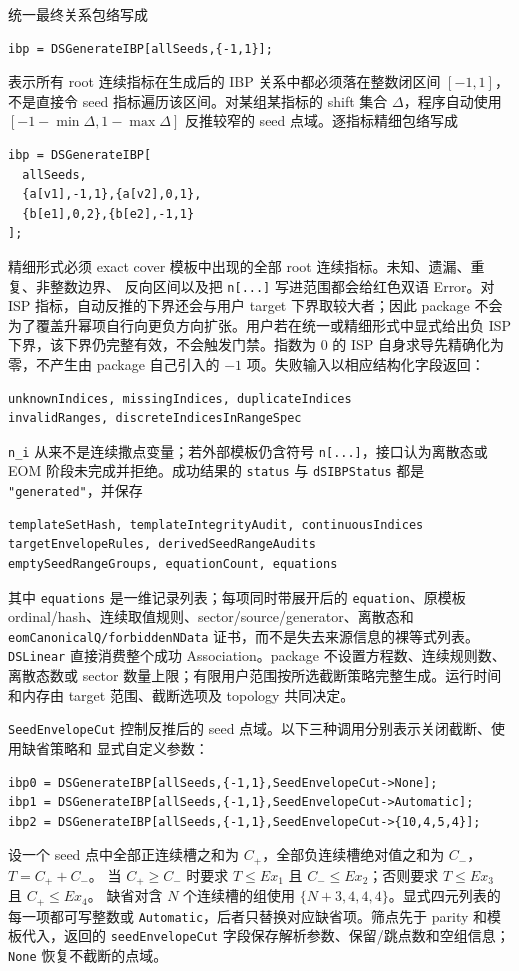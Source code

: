 ﻿\documentclass[a4paper,11pt]{article}
\begin{document}
统一最终关系包络写成
\begin{verbatim}
ibp = DSGenerateIBP[allSeeds,{-1,1}];
\end{verbatim}
表示所有 root 连续指标在生成后的 IBP 关系中都必须落在整数闭区间 $[-1,1]$，不是直接令
seed 指标遍历该区间。对某组某指标的 shift 集合 $\Delta$，程序自动使用
$[-1-\min\Delta,1-\max\Delta]$ 反推较窄的 seed 点域。逐指标精细包络写成
\begin{verbatim}
ibp = DSGenerateIBP[
  allSeeds,
  {a[v1],-1,1},{a[v2],0,1},
  {b[e1],0,2},{b[e2],-1,1}
];
\end{verbatim}
精细形式必须 exact cover 模板中出现的全部 root 连续指标。未知、遗漏、重复、非整数边界、
反向区间以及把 \texttt{n[...]} 写进范围都会给红色双语 Error。对 ISP 指标，自动反推的下界还会与用户 target 下界取较大者；因此 package 不会为了覆盖升幂项自行向更负方向扩张。用户若在统一或精细形式中显式给出负 ISP 下界，该下界仍完整有效，不会触发门禁。指数为 $0$ 的 ISP 自身求导先精确化为零，不产生由 package 自己引入的 $-1$ 项。失败输入以相应结构化字段返回：
\begin{verbatim}
unknownIndices, missingIndices, duplicateIndices
invalidRanges, discreteIndicesInRangeSpec
\end{verbatim}

\texttt{n\_i} 从来不是连续撒点变量；若外部模板仍含符号 \texttt{n[...]}，接口认为离散态或
EOM 阶段未完成并拒绝。成功结果的 \texttt{status} 与 \texttt{dSIBPStatus} 都是
\texttt{"generated"}，并保存
\begin{verbatim}
templateSetHash, templateIntegrityAudit, continuousIndices
targetEnvelopeRules, derivedSeedRangeAudits
emptySeedRangeGroups, equationCount, equations
\end{verbatim}
其中 \texttt{equations} 是一维记录列表；每项同时带展开后的 \texttt{equation}、原模板
ordinal/hash、连续取值规则、sector/source/generator、离散态和
\texttt{eomCanonicalQ/forbiddenNData} 证书，而不是失去来源信息的裸等式列表。
\texttt{DSLinear} 直接消费整个成功 Association。package 不设置方程数、连续规则数、离散态数或
sector 数量上限；有限用户范围按所选截断策略完整生成。运行时间和内存由 target 范围、截断选项及
topology 共同决定。

\texttt{SeedEnvelopeCut} 控制反推后的 seed 点域。以下三种调用分别表示关闭截断、使用缺省策略和
显式自定义参数：
\begin{verbatim}
ibp0 = DSGenerateIBP[allSeeds,{-1,1},SeedEnvelopeCut->None];
ibp1 = DSGenerateIBP[allSeeds,{-1,1},SeedEnvelopeCut->Automatic];
ibp2 = DSGenerateIBP[allSeeds,{-1,1},SeedEnvelopeCut->{10,4,5,4}];
\end{verbatim}
设一个 seed 点中全部正连续槽之和为 $C_+$，全部负连续槽绝对值之和为 $C_-$，$T=C_++C_-$。
当 $C_+\geq C_-$ 时要求 $T\leq Ex_1$ 且 $C_-\leq Ex_2$；否则要求 $T\leq Ex_3$ 且 $C_+\leq Ex_4$。
缺省对含 $N$ 个连续槽的组使用 $\{N+3,4,4,4\}$。显式四元列表的每一项都可写整数或
\texttt{Automatic}，后者只替换对应缺省项。筛点先于 parity 和模板代入，返回的
\texttt{seedEnvelopeCut} 字段保存解析参数、保留/跳点数和空组信息；\texttt{None} 恢复不截断的点域。
\end{document}
